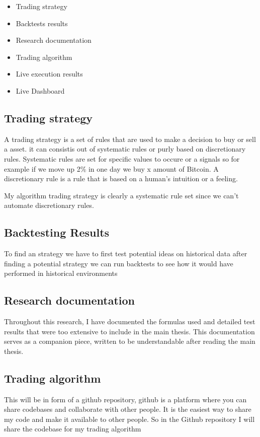 \documentclass[12pt]{article}
\begin{document}
\begin{itemize}
    \item Trading strategy
    \item Backtests results
    \item Research documentation
    \item Trading algorithm
    \item Live execution results
    \item Live Dashboard

\end{itemize}



\subsection{Trading strategy}
A trading strategy is a set of rules that are used to make a decision to buy or sell a asset. it can consistis out of systematic rules or purly based on discretionary rules.
Systematic rules are set for specific values to occure or a signals so for example if we move up 2\% in one day we buy x amount of Bitcoin. A discretionary rule is a rule that is based on a human's intuition or a feeling.

My algorithm trading strategy is clearly a systematic rule set since we can't automate discretionary rules.

\subsection{Backtesting Results}
To find an strategy we have to first test potential ideas on historical data after finding a potential strategy we can run backtests to see how it would have performed in historical environments




\subsection{Research documentation}
Throughout this research, I have documented the formulas used and detailed test results that were too extensive to include in the main thesis. This documentation serves as a companion piece, written to be understandable after reading the main thesis.


\subsection{Trading algorithm}
This will be in form of a github repository, github is a platform where you can share codebases and collaborate with other people.
It is the easiest way to share my code and make it available to other people. So in the Github repository I will share the codebase for my trading algorithm
\end{document}
